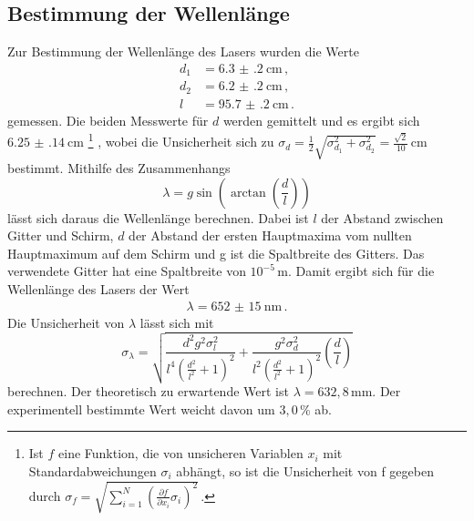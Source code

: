 \subsection{Bestimmung der Wellenlänge}
\label{subsec:wellenlaenge}
Zur Bestimmung der Wellenlänge des Lasers wurden die Werte
\begin{align*}
  d_1&=\SI{6.3(2)}{\centi\metre} \,,\\
  d_2&=\SI{6.2(2)}{\centi\metre}  \,,\\
  l&=\SI{95.7(2)}{\centi\metre} \,.
\end{align*}
gemessen.
Die beiden Messwerte für $d$ werden gemittelt und es ergibt sich $\SI{6.25(14)}{\centi\metre}$
\footnote{Ist $f$ eine Funktion, die von unsicheren Variablen $x_i$ mit
Standardabweichungen $\sigma_i$ abhängt, so ist die Unsicherheit von f gegeben durch
  $\sigma_f = \sqrt{
    \sum\limits_{i = 1}^N
      \left( \frac{\partial f}{\partial x_i} \sigma_i \right)^{\!\! 2}
  }\,.$
}
, wobei die Unsicherheit sich zu $\sigma_d = \frac{1}{2} \sqrt{\sigma_{d_1}^2+\sigma_{d_2}^2} = \frac{\sqrt{2}}{10}\,\text{cm}$
bestimmt.
Mithilfe des Zusammenhangs
\begin{equation*}
  \lambda= g \sin \left(\arctan\left(\frac{d}{l}\right)\right)
\end{equation*}
lässt sich daraus die Wellenlänge berechnen. Dabei ist $l$ der Abstand zwischen
Gitter und Schirm, $d$ der Abstand der ersten Hauptmaxima vom nullten Hauptmaximum
auf dem Schirm und g ist die Spaltbreite des Gitters. Das verwendete Gitter hat eine
Spaltbreite von $10^{-5}$\,m. Damit ergibt sich für die Wellenlänge des Lasers der Wert
\begin{align*}
  \lambda=\SI{652(15)}{\nano\metre}\,.
\end{align*}
Die Unsicherheit von $\lambda$ lässt sich mit
\begin{equation}
  \sigma_\lambda = \sqrt{\frac{d^{2} g^{2} \sigma_{l}^{2}}{l^{4} \left(\frac{d^{2}}{l^{2}} + 1\right)^{2}} + \frac{g^{2} \sigma_{d}^{2}}{l^{2} \left(\frac{d^{2}}{l^{2}} + 1\right)^{2}} {\left (\frac{d}{l} \right )}}
\end{equation}
berechnen.
Der theoretisch zu erwartende Wert ist $\lambda= 632,8$\,mm. Der experimentell bestimmte
Wert weicht davon um $3,0$\,\% ab.
